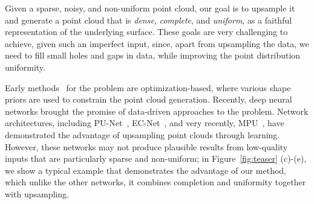 Given a sparse, noisy, and non-uniform point cloud, our goal is to upsample it and generate a point cloud that is \emph{dense}, \emph{complete}, and \emph{uniform}, as a faithful representation of the underlying surface.
%
These goals are very challenging to achieve, given such an imperfect input, since, apart from upsampling the data, we need to fill small holes and gaps in data, while improving the point distribution uniformity.
%

Early methods~\cite{alexa2003computing,lipman2007parameterization,huang2009consolidation,huang2013edge,wu2015deep} for the problem
are optimization-based, where various shape priors are used to constrain the point cloud generation.
%
Recently, deep neural networks brought the promise of data-driven approaches to the problem.
Network architectures, including PU-Net~\cite{yu2018pu}, EC-Net~\cite{yu2018ec}, and very recently, MPU~\cite{yifan2018patch}, have demonstrated the advantage of upsampling point clouds through learning.
%
%
However, these networks may not produce plausible results from low-quality inputs that are particularly sparse and non-uniform;
in Figure~\ref{fig:teaser} (c)-(e), we show a typical example that demonstrates the advantage of our method, which unlike the other networks, it combines completion and uniformity together with upsampling.

